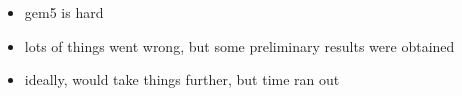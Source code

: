 \begin{itemize}
    \item gem5 is hard
    \item lots of things went wrong, but some preliminary results were obtained
    \item ideally, would take things further, but time ran out
\end{itemize}